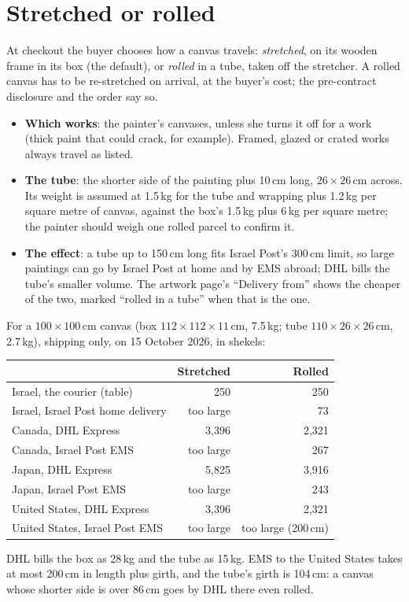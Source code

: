 \documentclass[11pt,a4paper]{article}
\begin{document}
\section{Stretched or rolled}\label{sec:rolled}
At checkout the buyer chooses how a canvas travels: \emph{stretched}, on its wooden frame in its
box (the default), or \emph{rolled} in a tube, taken off the stretcher. A rolled canvas has to be
re-stretched on arrival, at the buyer's cost; the pre-contract disclosure and the order say so.
\begin{itemize}
  \item \textbf{Which works}: the painter's canvases, unless she turns it off for a work (thick
    paint that could crack, for example). Framed, glazed or crated works always travel as listed.
  \item \textbf{The tube}: the shorter side of the painting plus 10\,cm long, $26\times26$\,cm
    across. Its weight is assumed at 1.5\,kg for the tube and wrapping plus 1.2\,kg per square
    metre of canvas, against the box's 1.5\,kg plus 6\,kg per square metre; the painter should
    weigh one rolled parcel to confirm it.
  \item \textbf{The effect}: a tube up to 150\,cm long fits Israel Post's 300\,cm limit, so
    large paintings can go by Israel Post at home and by EMS abroad; DHL bills the tube's smaller
    volume. The artwork page's ``Delivery from'' shows the cheaper of the two, marked ``rolled in
    a tube'' when that is the one.
\end{itemize}
For a $100\times100$\,cm canvas (box $112\times112\times11$\,cm, 7.5\,kg; tube
$110\times26\times26$\,cm, 2.7\,kg), shipping only, on 15 October 2026, in shekels:
\begin{center}
\small
{}
\begin{tabular}{@{}lrr@{}}
  \toprule
  & Stretched & Rolled \\
  \midrule
  Israel, the courier (table) & 250 & 250 \\
  Israel, Israel Post home delivery & too large & 73 \\
  Canada, DHL Express & 3{,}396 & 2{,}321 \\
  Canada, Israel Post EMS & too large & 267 \\
  Japan, DHL Express & 5{,}825 & 3{,}916 \\
  Japan, Israel Post EMS & too large & 243 \\
  United States, DHL Express & 3{,}396 & 2{,}321 \\
  United States, Israel Post EMS & too large & too large (200\,cm) \\
  \bottomrule
\end{tabular}
\end{center}
DHL bills the box as 28\,kg and the tube as 15\,kg. EMS to the United States takes at most
200\,cm in length plus girth, and the tube's girth is 104\,cm: a canvas whose shorter side is over
86\,cm goes by DHL there even rolled.
\end{document}
